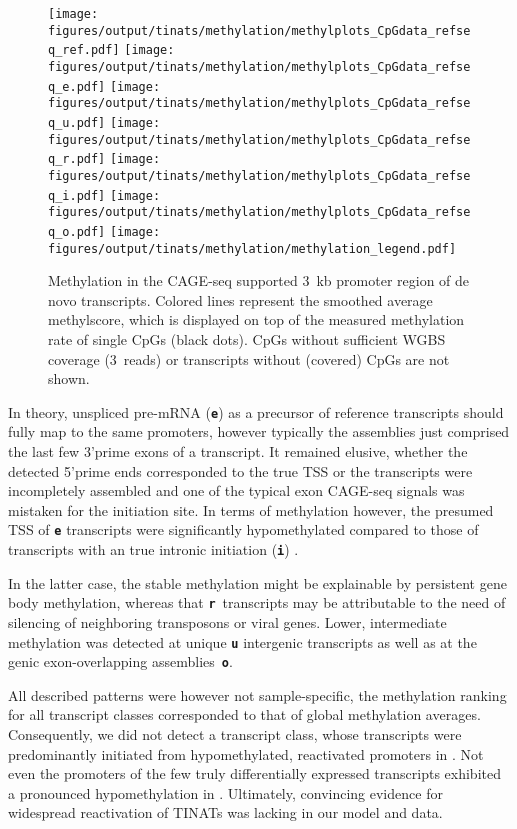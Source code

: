 \begin{figure}[!ht]
	\centering
	\texttt{[image: figures/output/tinats/methylation/methylplots\_CpGdata\_refseq\_ref.pdf]}
	\texttt{[image: figures/output/tinats/methylation/methylplots\_CpGdata\_refseq\_e.pdf]} 
	\texttt{[image: figures/output/tinats/methylation/methylplots\_CpGdata\_refseq\_u.pdf]}
	\texttt{[image: figures/output/tinats/methylation/methylplots\_CpGdata\_refseq\_r.pdf]} 
	\texttt{[image: figures/output/tinats/methylation/methylplots\_CpGdata\_refseq\_i.pdf]} 
	\texttt{[image: figures/output/tinats/methylation/methylplots\_CpGdata\_refseq\_o.pdf]}
	\texttt{[image: figures/output/tinats/methylation/methylation\_legend.pdf]} 
	\caption{Methylation in the CAGE-seq supported \SI{3}{kb} promoter region of de novo transcripts. Colored lines represent the smoothed average methylscore, which is displayed on top of the measured methylation rate of single CpGs (black dots). CpGs without sufficient WGBS coverage (\SI{3}{reads}) or transcripts without (covered) CpGs are not shown.}
	\label{fig:methylplots_CpGdata_refseq}
\end{figure}

In theory, unspliced pre-mRNA (\textbf{\texttt{e}}) as a precursor of reference transcripts should fully map to the same promoters, however typically the assemblies just comprised the last few 3'prime exons of a transcript. It remained elusive, whether the detected 5'prime ends corresponded to the true TSS or the transcripts were incompletely assembled and one of the typical exon CAGE-seq signals was mistaken for the initiation site. In terms of methylation however, the presumed TSS of \textbf{\texttt{e}} transcripts were significantly hypomethylated compared to those of transcripts with an true intronic initiation (\textbf{\texttt{i}}) . 

In the latter case, the stable methylation might be explainable by persistent gene body methylation, whereas that \textbf{\texttt{r}}~transcripts may be attributable to the need of silencing of neighboring transposons or viral genes. Lower, intermediate methylation was detected at unique \textbf{\texttt{u}} intergenic transcripts as well as at the genic exon-overlapping assemblies~\textbf{\texttt{o}}.

All described patterns were however not sample-specific, the methylation ranking for all transcript classes corresponded to that of global methylation averages. Consequently, we did not detect a transcript class, whose transcripts were predominantly initiated from hypomethylated, reactivated promoters in \dnmtchip. Not even the promoters of the few truly differentially expressed transcripts  exhibited a pronounced hypomethylation in \dnmtchip. Ultimately, convincing evidence for widespread reactivation of TINATs was lacking in our model and data. 


